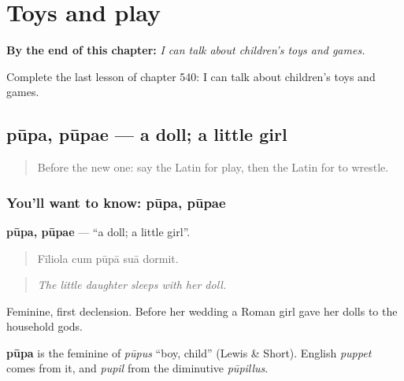 
\chapter{Toys and play}
\label{ch:la-toys-and-play}

\begin{chapteropening}
\textbf{By the end of this chapter:} \emph{I can talk about children's toys and games.}

Complete the last lesson of chapter 540: I can talk about children's toys and games.
\end{chapteropening}

\section[pūpa, pūpae]{pūpa, pūpae — a doll; a little girl}

\label{lesson:LA-C540-pupa}



\begin{quote}
Before the new one: say the Latin for play, then the Latin for to wrestle.
\end{quote}

\subsection*{You'll want to know: pūpa, pūpae}
\textbf{pūpa, pūpae} — \textquotedblleft{}a doll; a little girl\textquotedblright{}.

\begin{quote}
Fīliola cum pūpā suā dormit.
\end{quote}

\begin{quote}
\emph{The little daughter sleeps with her doll.}
\end{quote}

Feminine, first declension. Before her wedding a Roman girl gave her dolls to the household gods.

\begin{cousinweb}
\textbf{pūpa} is the feminine of \emph{pūpus} \textquotedblleft{}boy, child\textquotedblright{} (Lewis \& Short). English \emph{puppet} comes from it, and \emph{pupil} from the diminutive \emph{pūpillus}.
\end{cousinweb}

